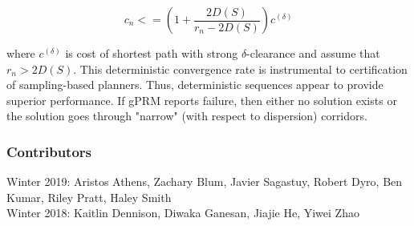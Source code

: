 \documentclass[twoside]{article}
\begin{document}
\begin{equation}
    c_n <= \left(1+\frac{2D(S)}{r_n-2D(S)}\right)c ^{(\delta)}
\end{equation}

where $c ^{(\delta)}$ is cost of shortest path with strong $\delta$-clearance and assume that $r_n > 2D(S)$. This deterministic convergence rate is instrumental to certification of sampling-based planners. Thus, deterministic sequences appear to provide superior performance. If gPRM reports failure, then either no solution exists or the solution goes through "narrow" (with respect to dispersion) corridors.

\subsubsection*{Contributors}
Winter 2019: Aristos Athens, Zachary Blum, Javier Sagastuy, Robert Dyro, Ben Kumar, Riley Pratt, Haley Smith
\\
Winter 2018: Kaitlin Dennison, Diwaka Ganesan, Jiajie He, Yiwei Zhao


\nocite{*}
{}
\end{document}
